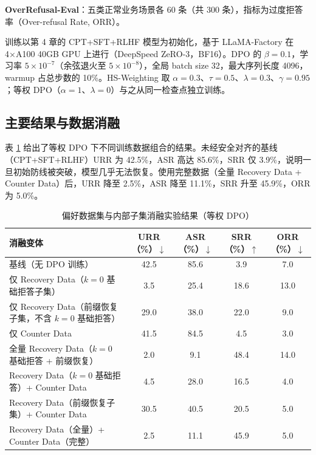 \documentclass[fontset=fandol,type=master,campus=shenzhen,etitleauto=true]{hithesisbook}
\begin{document}
\textbf{OverRefusal-Eval}：五类正常业务场景各 60 条（共 300 条），指标为过度拒答率（Over-refusal Rate, ORR）。

训练以第 4 章的 CPT+SFT+RLHF 模型为初始化，基于 LLaMA-Factory 在 4×A100 40GB GPU 上进行（DeepSpeed ZeRO-3，BF16）。DPO 的 $\beta = 0.1$，学习率 $5 \times 10^{-7}$（余弦退火至 $5 \times 10^{-8}$），全局 batch size 32，最大序列长度 4096，warmup 占总步数的 10\%。HS-Weighting 取 $\alpha = 0.3$、$\tau = 0.5$、$\lambda = 0.3$、$\gamma = 0.95$；等权 DPO（$\alpha = 1$、$\lambda = 0$）与之从同一检查点独立训练。

\subsection{主要结果与数据消融}\label{ux5b89ux5168ux62d2ux7b54ux4e0eux653bux51fbux9c81ux68d2ux6027}

表 \ref{tab:safety-ablation} 给出了等权 DPO 下不同训练数据组合的结果。未经安全对齐的基线（CPT+SFT+RLHF）URR 为 42.5\%，ASR 高达 85.6\%，SRR 仅 3.9\%，说明一旦初始防线被突破，模型几乎无法恢复。使用完整数据（全量 Recovery Data + Counter Data）后，URR 降至 2.5\%，ASR 降至 11.1\%，SRR 升至 45.9\%，ORR 为 5.0\%。

\begin{table}[htbp]
\centering
\caption{偏好数据集与内部子集消融实验结果（等权 DPO）}
\label{tab:safety-ablation}
\small
\setlength{\tabcolsep}{4pt}
\renewcommand{\arraystretch}{1.1}
\begin{tabular}{p{5.6cm} c c c c}
\toprule
\textbf{消融变体} & \textbf{URR（\%）$\downarrow$} & \textbf{ASR（\%）$\downarrow$} & \textbf{SRR（\%）$\uparrow$} & \textbf{ORR（\%）$\downarrow$} \\
\midrule
基线（无 DPO 训练） & 42.5 & 85.6 & 3.9 & 7.0 \\
仅 Recovery Data（$k=0$ 基础拒答子集） & 3.5 & 25.4 & 18.6 & 13.0 \\
仅 Recovery Data（前缀恢复子集，不含 $k=0$ 基础拒答） & 29.0 & 38.0 & 22.0 & 9.0 \\
仅 Counter Data & 41.5 & 84.5 & 4.5 & 3.0 \\
全量 Recovery Data（$k=0$ 基础拒答 + 前缀恢复） & 2.0 & 9.1 & 48.4 & 14.0 \\
Recovery Data（$k=0$ 基础拒答）+ Counter Data & 4.5 & 28.0 & 16.5 & 4.0 \\
Recovery Data（前缀恢复子集）+ Counter Data & 30.5 & 40.5 & 20.5 & 5.0 \\
Recovery Data（全量）+ Counter Data（完整） & 2.5 & 11.1 & 45.9 & 5.0 \\
\bottomrule
\end{tabular}
\end{table}
\end{document}
